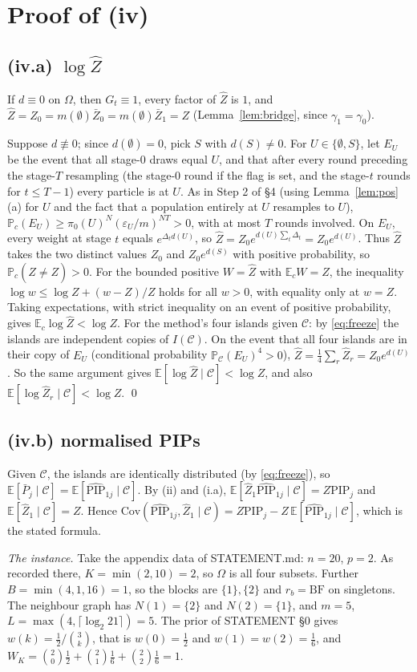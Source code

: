 \documentclass[11pt]{article}
\theoremstyle{remark}
\newcommand{\E}{\mathbb{E}}
\renewcommand{\P}{\mathbb{P}}
\newcommand{\cC}{\mathcal{C}}
\newcommand{\Zh}{\widehat Z}
\newcommand{\PIPh}{\widehat{\mathrm{PIP}}}
\newcommand{\PIP}{\mathrm{PIP}}
\newcommand{\Zb}{\bar Z}
\newcommand{\Om}{\Omega}
\begin{document}
\section{Proof of (iv)}

\subsection{(iv.a) $\log\Zh$}
If $d\equiv0$ on $\Om$, then $G_t\equiv1$, every factor of $\Zh$ is $1$, and $\Zh=Z_0=m(\emptyset)\Zb_0=m(\emptyset)\Zb_1=Z$ (Lemma~\ref{lem:bridge}, since $\gamma_1=\gamma_0$).

Suppose $d\not\equiv0$; since $d(\emptyset)=0$, pick $S$ with $d(S)\ne0$. For $U\in\{\emptyset,S\}$, let $E_U$ be the event that all stage-0 draws equal $U$, and that after every round preceding the stage-$T$ resampling (the stage-0 round if the flag is set, and the stage-$t$ rounds for $t\le T-1$) every particle is at $U$. As in Step 2 of \S4 (using Lemma~\ref{lem:pos}(a) for $U$ and the fact that a population entirely at $U$ resamples to $U$), $\P_c(E_U)\ge \pi_0(U)^N(\varepsilon_U/m)^{NT}>0$, with at most $T$ rounds involved. On $E_U$, every weight at stage $t$ equals $e^{\Delta_td(U)}$, so $\Zh=Z_0e^{d(U)\sum_t\Delta_t}=Z_0e^{d(U)}$. Thus $\Zh$ takes the two distinct values $Z_0$ and $Z_0e^{d(S)}$ with positive probability, so $\P_c(\Zh\ne Z)>0$. For the bounded positive $W=\Zh$ with $\E_cW=Z$, the inequality $\log w\le\log Z+(w-Z)/Z$ holds for all $w>0$, with equality only at $w=Z$. Taking expectations, with strict inequality on an event of positive probability, gives $\E_c\log\Zh<\log Z$. For the method's four islands given $\cC$: by \eqref{eq:freeze} the islands are independent copies of $I(\cC)$. On the event that all four islands are in their copy of $E_U$ (conditional probability $\P_\cC(E_U)^4>0$), $\Zh=\frac14\sum_r\Zh_r=Z_0e^{d(U)}$. So the same argument gives $\E[\log\Zh\mid\cC]<\log Z$, and also $\E[\log\Zh_r\mid\cC]<\log Z$. \qed

\subsection{(iv.b) normalised PIPs}
Given $\cC$, the islands are identically distributed (by \eqref{eq:freeze}), so $\E[\bar P_j\mid\cC]=\E[\PIPh_{1j}\mid\cC]$. By (ii) and (i.a), $\E[\Zh_1\PIPh_{1j}\mid\cC]=Z\PIP_j$ and $\E[\Zh_1\mid\cC]=Z$. Hence
$\mathrm{Cov}(\PIPh_{1j},\Zh_1\mid\cC)=Z\PIP_j-Z\,\E[\PIPh_{1j}\mid\cC]$, which is the stated formula.

\emph{The instance.} Take the appendix data of STATEMENT.md: $n=20$, $p=2$. As recorded there, $K=\min(2,10)=2$, so $\Om$ is all four subsets. Further $B=\min(4,1,16)=1$, so the blocks are $\{1\},\{2\}$ and $r_b=\mathrm{BF}$ on singletons. The neighbour graph has $N(1)=\{2\}$ and $N(2)=\{1\}$, and $m=5$, $L=\max(4,\lceil\log_2 21\rceil)=5$. The prior of STATEMENT \S0 gives $w(k)=\tfrac12/\binom{3}{k}$, that is $w(0)=\frac12$ and $w(1)=w(2)=\frac16$, and $W_K=\binom20\frac12+\binom21\frac16+\binom22\frac16=1$.
\end{document}
